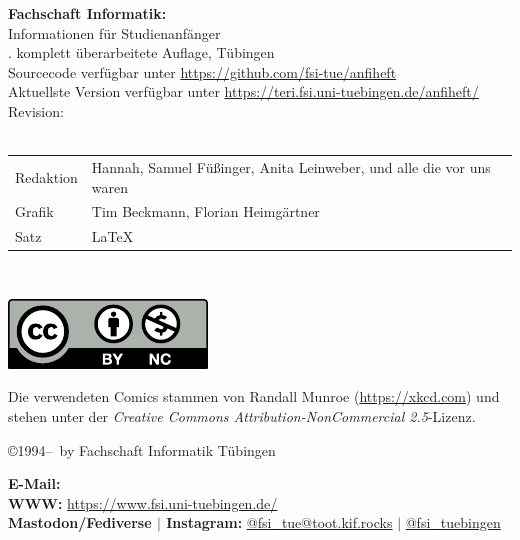 \thispagestyle{empty}

\textbf{Fachschaft Informatik:}\\
Informationen für Studienanfänger\\
\number\auflage. komplett überarbeitete Auf\/lage, Tübingen \number\jahr\\[0.2cm]
{\footnotesize Sourcecode verfügbar unter \url{https://github.com/fsi-tue/anfiheft}\\
               Aktuellste Version verfügbar unter \url{https://teri.fsi.uni-tuebingen.de/anfiheft/}\\
               Revision: \gitCommit\\[1cm]}
\medskip \\

\begin{tabular}{ll}
	Redaktion & Hannah, Samuel Füßinger, Anita Leinweber, und alle die vor uns waren \\ %
	Grafik & Tim Beckmann, Florian Heimgärtner \\
	Satz & \LaTeX
\end{tabular}\\

\vfill
\begin{minipage}[c]{0.1\textwidth}
	\includegraphics[width=\linewidth]{shared/logos/by-nc.pdf}
\end{minipage}
\begin{minipage}[c]{0.9\textwidth}
	Die verwendeten Comics stammen von Randall Munroe (\url{https://xkcd.com}) und stehen unter der \emph{Creative Commons Attribution-NonCommercial 2.5}-Lizenz.
\end{minipage}

\copyright 1994--\number\jahr ~by Fachschaft Informatik Tübingen\\

\medskip

\textbf{E-Mail:} \hfill
{}\\
\textbf{WWW:} \hfill
\url{https://www.fsi.uni-tuebingen.de/} \\
\textbf{Mastodon/Fediverse $\mid$ Instagram:} \hfill
\href{https://toot.kif.rocks/@fsi\_tue}{\faMastodon @fsi\_tue@toot.kif.rocks} $\mid$ 
\href{https://www.instagram.com/fsi\_tuebingen}{\faInstagram @fsi\_tuebingen} \\
\newpage
